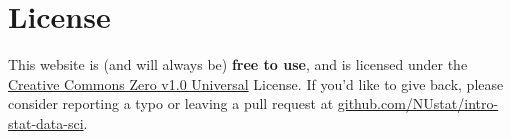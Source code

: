 \documentclass[
  letterpaper,
  DIV=11,
  numbers=noendperiod]{scrreprt}
\theoremstyle{definition}
\theoremstyle{remark}
\begin{document}
\begin{figure}

\begin{minipage}[t]{0.50\linewidth}

{\centering 


\caption{}

}

\end{minipage}%
%
\begin{minipage}[t]{0.50\linewidth}

{\centering 


\caption{}

}

\end{minipage}%

\end{figure}

\hypertarget{license}{%
\section*{License}\label{license}}

This website is (and will always be) \textbf{free to use}, and is
licensed under the
\href{https://creativecommons.org/publicdomain/zero/1.0/}{Creative
Commons Zero v1.0 Universal} License. If you'd like to give back, please
consider reporting a typo or leaving a pull request at
\href{https://github.com/NUstat/intro-stat-data-sci}{github.com/NUstat/intro-stat-data-sci}.
\end{document}
